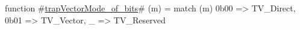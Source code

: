 function #\hyperref[sailRISCVztrapVectorModezyofzybits]{trapVectorMode\_of\_bits}# (m) =
  match (m) {
    0b00 => TV_Direct,
    0b01 => TV_Vector,
    _    => TV_Reserved
  }
